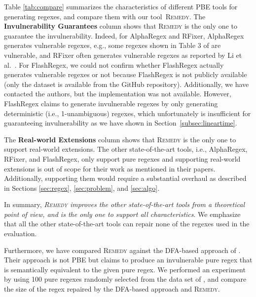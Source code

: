 \documentclass[conference]{IEEEtran}
\newcommand{\tool}{\textsc{Remedy}}
\begin{document}
Table \ref{tab:compare} summarizes the characteristics of different PBE tools for generating regexes, and compare them with our tool~\tool{}.
The {\bf Invulnerability Guarantees} column shows that \tool{} is the only one to guarantee the invulnerability.
Indeed, for AlphaRegex and RFixer, AlphaRegex generates vulnerable regexes, e.g., some regexes shown in Table 3 of \cite{10.1145/3093335.2993244} are vulnerable, and RFixer often generates vulnerable regexes as reported by Li et al.~\cite{FlashRegex}.
For FlashRegex, we could not confirm whether FlashRegex actually generates vulnerable regexes or not because FlashRegex is not publicly available (only the dataset is available from the GitHub repository). Additionally, we have contacted the authors, but the implementation was not available.
However, FlashRegex claims to generate invulnerable regexes by only generating deterministic (i.e., 1-unambiguous) regexes, which unfortunately is insufficient for guaranteeing invulnerability as we have shown in Section~\ref{subsec:lineartime}.


The {\bf Real-world Extensions} column shows that \tool{} is the only one to support real-world extensions.
The other state-of-the-art tools, i.e., AlphaRegex, RFixer, and FlashRegex, only support pure regexes and supporting real-world extensions is out of scope for their work as mentioned in their papers.
Additionally, supporting them would require a substantial overhaul as described in Sections \ref{sec:regex}, \ref{sec:problem}, and \ref{sec:algo}.



In summary, {\em \tool{} improves the other state-of-the-art tools from a theoretical point of view, and is the only one to support all characteristics}.
We emphasize that all the other state-of-the-art tools can repair none of the regexes used in the evaluation.


Furthermore, we have compared \tool{} against the DFA-based approach of \cite{10.1145/3129416.3129440}.  Their approach is not PBE but claims to produce an invulnerable pure regex that is semantically equivalent to the given pure regex. 
We performed an experiment by using 100 pure regexes randomly selected from the data set of \cite{Davis:2018:IRE:3236024.3236027}, and compare the size of the regex repaired by the DFA-based approach and \tool{}.
\end{document}
